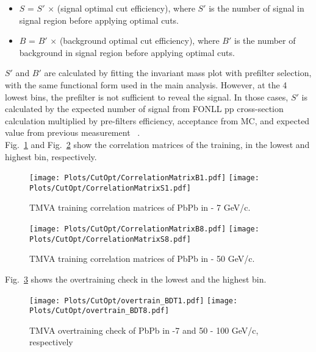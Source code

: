 \begin{itemize}
\item $S$ = $S'$ $\times$ (signal optimal cut efficiency), where $S'$ is the number of signal in signal region before applying optimal cuts.
\item $B$ = $B'$ $\times$ (background optimal cut efficiency), where $B'$ is the number of background in signal region before applying optimal cuts.
\end{itemize}

$S'$ and $B'$ are calculated by fitting the invariant mass plot with prefilter selection, with the same functional form used in the main analysis. However, at the 4 lowest \pt bins, the prefilter is not sufficient to reveal the signal. In those cases, $S'$ is calculated by the expected number of signal from FONLL pp cross-section calculation multiplied by pre-filters efficiency, acceptance from MC, and expected \raa value from previous measurement ~\cite{CMS-PAS-HIN-16-011}. \\
Fig.~\ref{fig:tmvaPbPbCorr1} and Fig.~\ref{fig:tmvaPbPbCorr8} show the correlation matrices of the training, in the lowest and highest \pt bin, respectively.

\begin{figure}[h]
\begin{center}
\texttt{[image: Plots/CutOpt/CorrelationMatrixB1.pdf]}
\texttt{[image: Plots/CutOpt/CorrelationMatrixS1.pdf]}
\caption{TMVA training correlation matrices of PbPb in  - 7 GeV/c.}
\label{fig:tmvaPbPbCorr1}
\end{center}
\end{figure}

\begin{figure}[h]
\begin{center}
\texttt{[image: Plots/CutOpt/CorrelationMatrixB8.pdf]}
\texttt{[image: Plots/CutOpt/CorrelationMatrixS8.pdf]}
\caption{TMVA training correlation matrices of PbPb in  - 50 GeV/c.}
\label{fig:tmvaPbPbCorr8}
\end{center}
\end{figure}

\clearpage
Fig.~\ref{fig:tmvaPbPbOvertrain18} shows the overtraining check in the lowest and the highest \pt bin. \\

\begin{figure}[h]
\begin{center}
\texttt{[image: Plots/CutOpt/overtrain\_BDT1.pdf]}
\texttt{[image: Plots/CutOpt/overtrain\_BDT8.pdf]}
\caption{TMVA overtraining check of PbPb in -7 and 50 - 100 GeV/c, respectively}
\label{fig:tmvaPbPbOvertrain18}
\end{center}
\end{figure}

